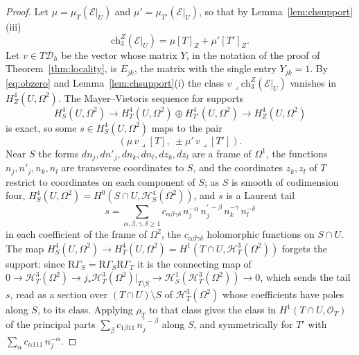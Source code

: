 \documentclass[11pt,reqno]{amsart}
\numberwithin{equation}{section}
\theoremstyle{plain}
\theoremstyle{definition}
\newcommand{\ch}{\mathrm{ch}}
\newcommand{\cD}{\mathcal{D}}
\begin{document}
\begin{proof}
Let $\mu=\mu_{T}(\mathcal{E}|_{U})$ and $\mu'=\mu_{T'}(\mathcal{E}|_{U})$, so that by Lemma~\ref{lem:chsupport}(iii)
\[
\ch^{Z}_{3}(\mathcal{E}|_{U})=\mu[T]_{Z}+\mu'[T']_{Z}.
\]
Let $v\in T\cD_{h}$ be the vector whose matrix $Y$, in the notation of the proof of Theorem~\ref{thm:locality}, is $E_{jk}$, the matrix with the single entry $Y_{jk}=1$. By \eqref{eq:obzero} and Lemma~\ref{lem:chsupport}(i) the class $v\lrcorner\ch^{Z}_{3}(\mathcal{E}|_{U})$ vanishes in $H^{4}_{Z}(U,\Omega^{2})$. The Mayer--Vietoris sequence for supports
\[
H^{4}_{S}(U,\Omega^{2})\to H^{4}_{T}(U,\Omega^{2})\oplus H^{4}_{T'}(U,\Omega^{2})\to H^{4}_{Z}(U,\Omega^{2})
\]
is exact, so some $s\in H^{4}_{S}(U,\Omega^{2})$ maps to the pair
\[
(\mu\,v\lrcorner[T],\ \pm\mu'\,v\lrcorner[T']).
\]
Near $S$ the forms $dn_{j},dn'_{j},dn_{k},dn_{l},dz_{k},dz_{l}$ are a frame of $\Omega^{1}$, the functions $n_{j},n'_{j},n_{k},n_{l}$ are transverse coordinates to $S$, and the coordinates $z_{k},z_{l}$ of $T$ restrict to coordinates on each component of $S$; as $S$ is smooth of codimension four, $H^{4}_{S}(U,\Omega^{2})=H^{0}(S\cap U,\mathcal{H}^{4}_{S}(\Omega^{2}))$, and $s$ is a Laurent tail
\[
s=\sum_{\alpha,\beta,\gamma,\delta\ge1}c_{\alpha\beta\gamma\delta}\,n_{j}^{-\alpha}\,n_{j}^{\prime\,-\beta}\,n_{k}^{-\gamma}\,n_{l}^{-\delta}
\]
in each coefficient of the frame of $\Omega^{2}$, the $c_{\alpha\beta\gamma\delta}$ holomorphic functions on $S\cap U$. The map $H^{4}_{S}(U,\Omega^{2})\to H^{4}_{T}(U,\Omega^{2})=H^{1}(T\cap U,\mathcal{H}^{3}_{T}(\Omega^{2}))$ forgets the support: since $\mathrm{R}\Gamma_{S}=\mathrm{R}\Gamma_{S}\mathrm{R}\Gamma_{T}$ it is the connecting map of $0\to\mathcal{H}^{3}_{T}(\Omega^{2})\to j_{*}\mathcal{H}^{3}_{T}(\Omega^{2})|_{T\setminus S}\to\mathcal{H}^{1}_{S}(\mathcal{H}^{3}_{T}(\Omega^{2}))\to0$, which sends the tail $s$, read as a section over $(T\cap U)\setminus S$ of $\mathcal{H}^{3}_{T}(\Omega^{2})$ whose coefficients have poles along $S$, to its class. Applying $\rho_{T}$ to that class gives the class in $H^{1}(T\cap U,\mathcal{O}_{T})$ of the principal parts $\sum_{\beta}c_{1\beta11}\,n_{j}^{\prime\,-\beta}$ along $S$, and symmetrically for $T'$ with $\sum_{\alpha}c_{\alpha111}\,n_{j}^{-\alpha}$.


\end{proof}
\end{document}
